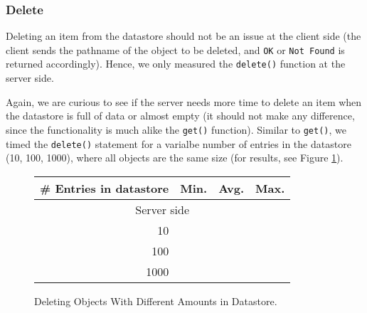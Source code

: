 \subsubsection{Delete}
Deleting an item from the datastore should not be an issue at the client side
(the client sends the pathname of the object to be deleted, and \texttt{OK} or
\texttt{Not Found} is returned accordingly). Hence, we only measured the
\texttt{delete()} function at the server side. 

Again, we are curious to see if the server needs more time to delete an item
when the datastore is full of data or almost empty (it should not make any
difference, since the functionality is much alike the \texttt{get()} function).
Similar to \texttt{get()}, we timed the \texttt{delete()} statement for a
varialbe number of entries in the datastore (10, 100, 1000), where all objects
are the same size (for results, see Figure \ref{del-obj-amt}).

\begin{figure}
\begin{tabular}{|r|r|r|r|}
\hline
\# Entries in datastore & Min. & Avg. & Max. \\
\hline
\multicolumn{4}{|c|}{Server side} \\
\hline
10 &  \\
100 &  \\
1000 &  \\
\hline
\end{tabular}
\caption{Deleting Objects With Different Amounts in Datastore.
\label{del-obj-amt}}
\end{figure}


